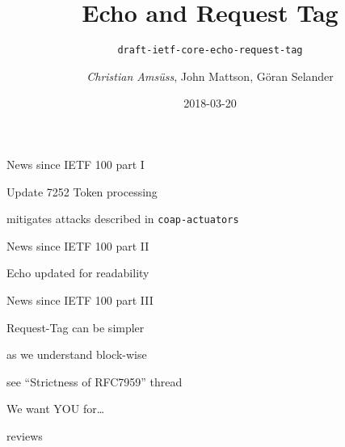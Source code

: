 \documentclass{beamer}
\title{Echo and Request Tag}
\subtitle{\texttt{draft-ietf-core-echo-request-tag}}
\author{\textit{Christian Amsüss}, John Mattson, Göran Selander}
\date{2018-03-20}
\begin{document}
\frame{\titlepage}

\begin{frame}{News since IETF 100 part I}\begin{center}
	\Huge Update 7252 Token processing

	\bigskip

	\Large mitigates attacks described in \texttt{coap-actuators}


\end{center}\end{frame}

\begin{frame}{News since IETF 100 part II}\begin{center}
	\Huge Echo updated for readability

\end{center}\end{frame}

\begin{frame}{News since IETF 100 part III}\begin{center}
	\Huge Request-\hspace{-0.1em}Tag can be simpler

	\bigskip

	\Large as we understand block-wise

	\bigskip

	\Large see “Strictness of RFC7959” thread

\end{center}\end{frame}

\begin{frame}{We want YOU for…}\begin{center}
	\Huge reviews
\end{center}\end{frame}

\end{document}
